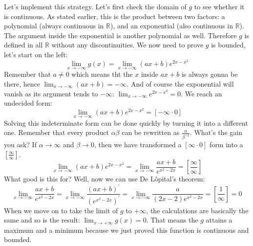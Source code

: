 Let's implement this strategy. Let's first check the domain of $g$
to see whether it is continuous. As stated earlier, this is the product
between two factors: a polynomial (always continuous in $\mathbb{R}$),
and an exponential (also continuous in $\mathbb{R}$). The argument
inside the exponential is another polynomial as well. Therefore
$g$ is defined in all $\mathbb{R}$ without any discontinuities.
We now need to prove $g$ is bounded, let's start on the left:
\begin{equation*}
    \lim_{x \to -\infty} g(x) = \lim_{x \to -\infty} (ax + b)e^{2x - x^2}
\end{equation*}
Remember that $a \neq 0$ which means tht the $x$ inside $ax + b$ is
always gonna be there, hence $\lim_{x \to -\infty} (ax + b) = -\infty$.
And of course the exponential will vanish as its argument tends
to $-\infty$: $\lim_{x \to -\infty} e^{2x - x^2} = 0$. We reach
an undecided form:
\begin{equation*}
    \lim_{x \to -\infty} (ax + b)e^{2x - x^2} =
        [-\infty \cdot 0]
\end{equation*}
Solving this indeterminate form can be done quickly by turning it into
a different one. Remember that every product $\alpha \beta$ can be
rewritten as $\frac{\alpha}{\beta^{-1}}$. What's the gain you ask?
If $\alpha \to \infty$ and $\beta \to 0$, then we have transformed a
$[\infty \cdot 0]$ form into a $[\frac{\infty}{\infty}]$.
\begin{equation*}
    \lim_{x \to -\infty} (ax + b)e^{2x - x^2} =
    \lim_{x \to -\infty} \frac{ax + b}{e^{x^2 - 2x}} =
    \left[\frac{\infty}{\infty}\right]
\end{equation*}
What good is this for? Well, now we can use De L\^{o}pital's
theorem\sidenote{\label{sn:dehopital}\snippetdelopitaltheorem}:
\begin{equation*}
    \lim_{x \to -\infty} \frac{ax + b}{e^{x^2 - 2x}} =
    \lim_{x \to -\infty} \frac{(ax + b)^\prime}{\left( e^{x^2 - 2x} \right)^\prime} =
    \lim_{x \to -\infty} \frac{a}{(2x - 2)e^{x^2 - 2x}} =
    \left[\frac{1}{\infty}\right] = 0
\end{equation*}
When we move on to take the limit of $g$ to $+\infty$,
the calculations are basically
the same and so is the result: $\lim_{x \to +\infty} g(x) = 0$.
That means the $g$ attains a maximum and a minimum because we just proved this
function is continuous and bounded.

